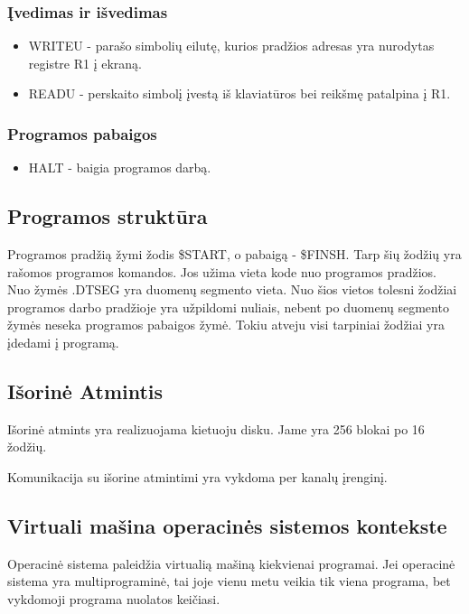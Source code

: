 \documentclass{VUMIFInfKursinis}
\begin{document}
\subsubsection{Įvedimas ir išvedimas}
\begin{itemize}
	\item WRITEU - parašo simbolių eilutę, kurios pradžios adresas yra nurodytas registre R1 į ekraną.
	\item READU - perskaito simbolį įvestą iš klaviatūros bei reikšmę patalpina į R1.
\end{itemize}

\subsubsection{Programos pabaigos}
\begin{itemize}
	\item HALT - baigia programos darbą.
\end{itemize}

\subsection{Programos struktūra}

Programos pradžią žymi žodis \$START, o pabaigą - \$FINSH. Tarp šių žodžių yra rašomos programos komandos. Jos užima vieta kode nuo programos pradžios. Nuo žymės .DTSEG yra duomenų segmento vieta. Nuo šios vietos tolesni žodžiai programos darbo pradžioje yra užpildomi nuliais, nebent po duomenų segmento žymės neseka programos pabaigos žymė. Tokiu atveju visi tarpiniai žodžiai yra įdedami į programą.

\subsection{Išorinė Atmintis}

Išorinė atmints yra realizuojama kietuoju disku. Jame yra 256 blokai po 16 žodžių.

Komunikacija su išorine atmintimi yra vykdoma per kanalų įrenginį.

\subsection{Virtuali mašina operacinės sistemos kontekste}

Operacinė sistema paleidžia virtualią mašiną kiekvienai programai. Jei operacinė sistema yra multiprograminė, tai joje vienu metu veikia tik viena programa, bet vykdomoji programa nuolatos keičiasi.

\printbibliography[heading=bibintoc] %
\appendix  %
\end{document}
